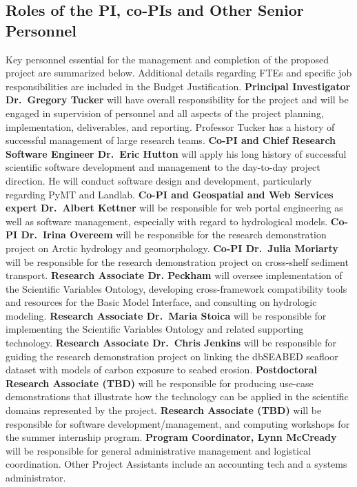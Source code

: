 \subsection*{Roles of the PI, co-PIs and Other Senior Personnel}
Key personnel essential for the management and completion of the proposed project are summarized below. Additional details regarding FTEs and specific job responsibilities are included in the Budget Justification. \textbf{Principal Investigator Dr.\ Gregory Tucker} will have overall responsibility for the project and will be engaged in supervision of personnel and all aspects of the project planning, implementation, deliverables, and reporting. Professor Tucker has a history of successful management of large research teams.  \textbf{Co-PI and Chief Research Software Engineer Dr.\ Eric Hutton} will apply his long history of successful scientific software development and management to the day-to-day project direction. He will conduct software design and development, particularly regarding PyMT and Landlab.  \textbf{Co-PI and Geospatial and Web Services expert Dr.\ Albert Kettner} will be responsible for web portal engineering as well as software management, especially with regard to hydrological models.  \textbf{Co-PI Dr.\ Irina Overeem} will be responsible for the research demonstration project on Arctic hydrology and geomorphology.  \textbf{Co-PI Dr.\ Julia Moriarty} will be responsible for the research demonstration project on cross-shelf sediment transport.  \textbf{Research Associate Dr. Peckham} will oversee implementation of the Scientific Variables Ontology, developing cross-framework compatibility tools and resources for the Basic Model Interface, and consulting on hydrologic modeling.  \textbf{Research Associate Dr.\ Maria Stoica} will be responsible for implementing the Scientific Variables Ontology and related supporting technology.  \textbf{Research Associate Dr.\ Chris Jenkins} will be responsible for guiding the research demonstration project on linking the dbSEABED seafloor dataset with models of carbon exposure to seabed erosion.  \textbf{Postdoctoral Research Associate (TBD)} will be responsible for producing use-case demonstrations that illustrate how the technology can be applied in the scientific domains represented by the project.  \textbf{Research Associate (TBD)} will be responsible for %
software development/management, and computing workshops for the summer internship program. \textbf{Program Coordinator, Lynn McCready} will be responsible for general administrative management and logistical coordination. Other Project Assistants include an accounting tech and a systems administrator.

